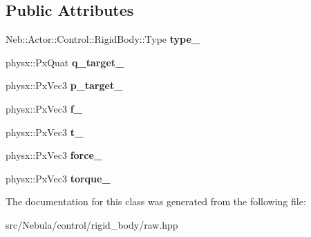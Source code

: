 \subsection*{\-Public \-Attributes}
\begin{DoxyCompactItemize}
\item 
\hypertarget{classNeb_1_1Actor_1_1Control_1_1RigidBody_1_1Raw_ae7e51993fff11fd62a2377288c0ea36d}{\-Neb\-::\-Actor\-::\-Control\-::\-Rigid\-Body\-::\-Type {\bfseries type\-\_\-}}\label{classNeb_1_1Actor_1_1Control_1_1RigidBody_1_1Raw_ae7e51993fff11fd62a2377288c0ea36d}

\item 
\hypertarget{classNeb_1_1Actor_1_1Control_1_1RigidBody_1_1Raw_aaf461eabaa914d60a5e3a1cfdec8511b}{physx\-::\-Px\-Quat {\bfseries q\-\_\-target\-\_\-}}\label{classNeb_1_1Actor_1_1Control_1_1RigidBody_1_1Raw_aaf461eabaa914d60a5e3a1cfdec8511b}

\item 
\hypertarget{classNeb_1_1Actor_1_1Control_1_1RigidBody_1_1Raw_a40a3bd57d74507d17f3c41f06fb5b04a}{physx\-::\-Px\-Vec3 {\bfseries p\-\_\-target\-\_\-}}\label{classNeb_1_1Actor_1_1Control_1_1RigidBody_1_1Raw_a40a3bd57d74507d17f3c41f06fb5b04a}

\item 
\hypertarget{classNeb_1_1Actor_1_1Control_1_1RigidBody_1_1Raw_a0f135d00c2d4b25ab97f50ccea1bfa6f}{physx\-::\-Px\-Vec3 {\bfseries f\-\_\-}}\label{classNeb_1_1Actor_1_1Control_1_1RigidBody_1_1Raw_a0f135d00c2d4b25ab97f50ccea1bfa6f}

\item 
\hypertarget{classNeb_1_1Actor_1_1Control_1_1RigidBody_1_1Raw_ac0f35eca80668493375669d3ab8b7f7a}{physx\-::\-Px\-Vec3 {\bfseries t\-\_\-}}\label{classNeb_1_1Actor_1_1Control_1_1RigidBody_1_1Raw_ac0f35eca80668493375669d3ab8b7f7a}

\item 
\hypertarget{classNeb_1_1Actor_1_1Control_1_1RigidBody_1_1Raw_a0b420e7290684f273e248eafec5e4c29}{physx\-::\-Px\-Vec3 {\bfseries force\-\_\-}}\label{classNeb_1_1Actor_1_1Control_1_1RigidBody_1_1Raw_a0b420e7290684f273e248eafec5e4c29}

\item 
\hypertarget{classNeb_1_1Actor_1_1Control_1_1RigidBody_1_1Raw_a994b85a62d3f32fa17a34449d35c2ff1}{physx\-::\-Px\-Vec3 {\bfseries torque\-\_\-}}\label{classNeb_1_1Actor_1_1Control_1_1RigidBody_1_1Raw_a994b85a62d3f32fa17a34449d35c2ff1}

\end{DoxyCompactItemize}


\-The documentation for this class was generated from the following file\-:\begin{DoxyCompactItemize}
\item 
src/\-Nebula/control/rigid\-\_\-body/raw.\-hpp\end{DoxyCompactItemize}
